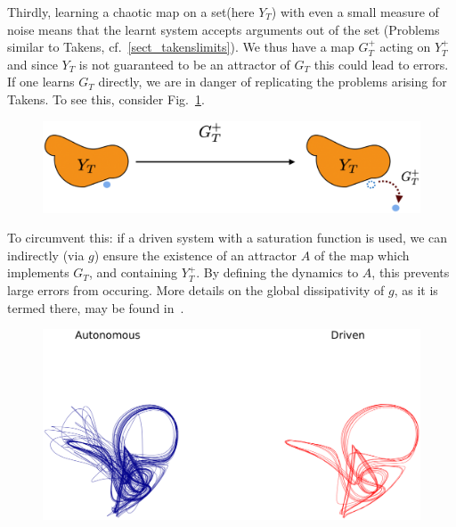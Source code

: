 \documentclass[a4paper,12pt,twoside]{report}
\begin{document}


Thirdly, learning a chaotic map on a set(here $Y_T$) with even a small measure of noise  means that the learnt system accepts arguments out of the set (Problems similar to Takens, cf.~\ref{sect_takenslimits}). 
We thus have a map $G_T^+$ acting on $Y_T^+$ and since $Y_T$ is not guaranteed to be an attractor of $G_T$ this could lead to errors.
If one learns $G_T$ directly, we are in danger of replicating the problems arising for Takens.  To see this, consider Fig.~\ref{fig:YtGtFailure}.

\begin{figure}[ht]
  \includegraphics[scale=0.25]{_YTerrors.eps}
  \centering
  \label{fig:YtGtFailure}
\end{figure}

To circumvent this: if a driven system with a saturation function is used, we can indirectly (via $g$) ensure the existence of an attractor $A$ of the map which implements $G_T$, and containing $Y_T^+$.  
By defining the dynamics to $A$, this prevents large errors from occuring.  
More details on the global dissipativity of $g$, as it is termed there, may be found in~\cite{Supp}.

\begin{figure}[ht]
  \includegraphics[scale=0.25]{_autovsdriven.eps}
  \centering
  \label{fig:learningFailure}
\end{figure}
\end{document}
